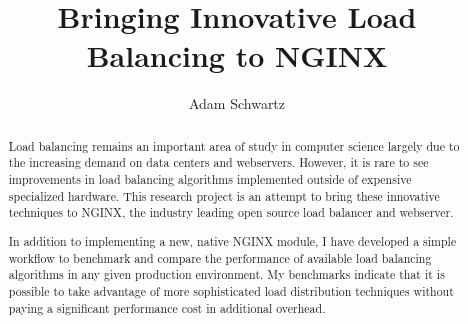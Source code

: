 \documentclass[sigconf]{acmart}
\begin{document}
\title{Bringing Innovative Load Balancing to NGINX}

\author{Adam Schwartz}

\renewcommand{\shortauthors}{A. Schwartz}
\newcommand{\code}[1]{\texttt{#1}}

\begin{abstract}
Load balancing remains an important area of study in computer science
largely due to the increasing demand on data centers and webservers.
However, it is rare to see improvements in load balancing algorithms
implemented outside of expensive specialized hardware. This research
project is an attempt to bring these innovative techniques to NGINX,
the industry leading open source load balancer and webserver.

In addition to implementing a new, native NGINX module, I have
developed a simple workflow to benchmark and compare the performance
of available load balancing algorithms in any given production
environment. My benchmarks indicate that it is possible to take
advantage of more sophisticated load distribution techniques without
paying a significant performance cost in additional overhead.
\end{abstract}

\maketitle




 
\end{document}
